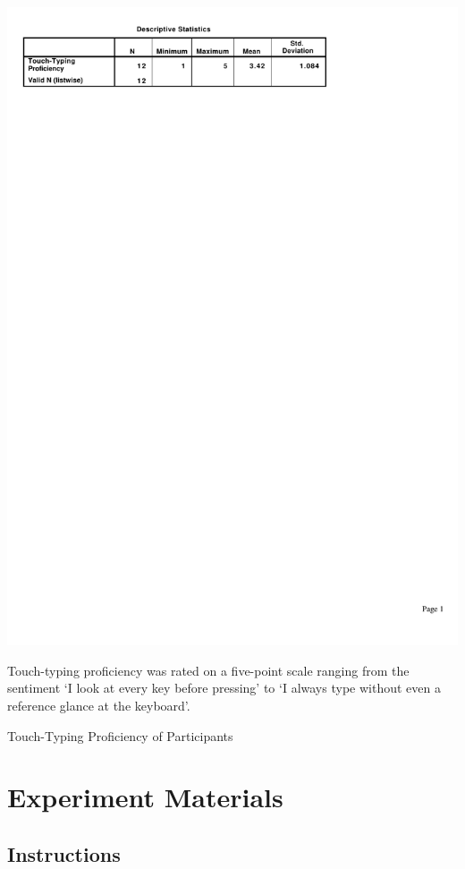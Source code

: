 \documentclass[11pt,openright,a4paper]{report}
\begin{document}
\begin{table}[ht]
\centerline{\includegraphics{figures/TouchTyping.pdf}}
\label{fig:partic_ttype}
\medskip
\small
Touch-typing proficiency was rated on a five-point scale ranging from the sentiment `I look at every key before pressing' to `I always type without even a reference glance at the keyboard'.
\caption{Touch-Typing Proficiency of Participants}
\end{table}

\section{Experiment Materials}
\subsection{Instructions}
\label{sec:instructions}
\newcommand{\somesheet}[1]{\centering\texttt{[image: \#1]}}
\end{document}

